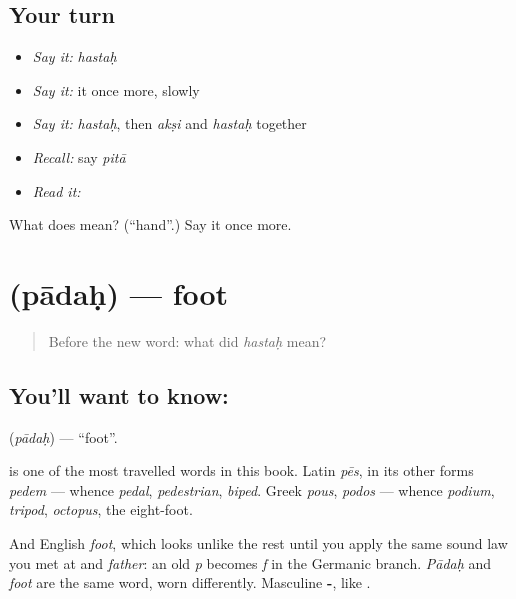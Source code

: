\subsection*{Your turn}
\begin{itemize}
\raggedright
  \item \emph{Say it:} \emph{hastaḥ}
  \item \emph{Say it:} it once more, slowly
  \item \emph{Say it:} \emph{hastaḥ}, then \emph{akṣi} and \emph{hastaḥ} together
  \item \emph{Recall:} say \emph{pitā}
  \item \emph{Read it:} \textbf{}
\end{itemize}

\begin{tcolorbox}[breakable,colback=teal!4,colframe=teal!35!black,title={Before you move on}]
What does  mean? (\textquotedblleft{}hand\textquotedblright{}.) Say it once more.
\end{tcolorbox}
\section[\texorpdfstring{\sk{पादः} (pādaḥ)}{पादः (pādaḥ)}]{ (pādaḥ) — foot}

\label{lesson:SA-C25-foot}



\begin{quote}
Before the new word: what did \emph{hastaḥ} mean?
\end{quote}

\subsection*{You'll want to know: }
\textbf{} (\emph{pādaḥ}) — \textquotedblleft{}foot\textquotedblright{}.

\textbf{} is one of the most travelled words in this book. Latin \emph{pēs}, in its other forms \emph{pedem} — whence \emph{pedal}, \emph{pedestrian}, \emph{biped}. Greek \emph{pous}, \emph{podos} — whence \emph{podium}, \emph{tripod}, \emph{octopus}, the eight-foot.

And English \emph{foot}, which looks unlike the rest until you apply the same sound law you met at  and \emph{father}: an old \emph{p} becomes \emph{f} in the Germanic branch. \emph{Pādaḥ} and \emph{foot} are the same word, worn differently. Masculine \textbf{-}, like .

